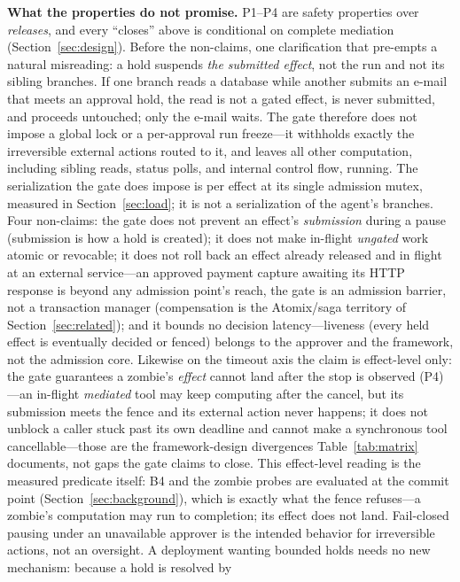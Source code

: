 \documentclass[10pt,journal,compsoc]{IEEEtran}
\begin{document}
\noindent\textbf{What the properties do not promise.} P1--P4 are safety
properties over \emph{releases}, and every ``closes'' above is conditional on
complete mediation (Section~\ref{sec:design}). Before the non-claims, one
clarification that pre-empts a natural misreading: a hold suspends
\emph{the submitted effect}, not the run and not its sibling branches. If one
branch reads a database while another submits an e-mail that meets an
approval hold, the read is not a gated effect, is never submitted, and
proceeds untouched; only the e-mail waits. The gate therefore does not impose
a global lock or a per-approval run freeze---it withholds exactly the
irreversible external actions routed to it, and leaves all other computation,
including sibling reads, status polls, and internal control flow, running.
The serialization the gate does impose is per effect at its single admission
mutex, measured in Section~\ref{sec:load}; it is not a serialization of the
agent's branches. Four non-claims: the gate does not prevent an
effect's \emph{submission} during a pause (submission is how a hold is
created); it does not make in-flight \emph{ungated} work atomic or revocable;
it does not roll back an effect already released and in flight at an
external service---an approved payment capture awaiting its HTTP response is
beyond any admission point's reach, the gate is an admission barrier, not a
transaction manager (compensation is the Atomix/saga territory of
Section~\ref{sec:related});
and it bounds no decision latency---liveness (every held effect is eventually
decided or fenced) belongs to the approver and the framework, not the
admission core. Likewise on the timeout axis the claim is effect-level only:
the gate guarantees a zombie's \emph{effect} cannot land after the stop is
observed (P4)---an in-flight \emph{mediated} tool may keep computing after
the cancel, but its submission meets the fence and its external action never
happens; it does not unblock a caller stuck past its own deadline and
cannot make a synchronous tool cancellable---those are the framework-design
divergences Table~\ref{tab:matrix} documents, not gaps the gate claims to
close. This effect-level reading is the measured predicate itself: B4 and the zombie probes are evaluated at the commit point (Section~\ref{sec:background}), which is exactly what the fence refuses---a zombie's computation may run to completion; its effect does not land. Fail-closed pausing under an unavailable approver is the
intended behavior for irreversible actions, not an oversight. A deployment
wanting bounded holds needs no new mechanism: because a hold is resolved by
\end{document}
